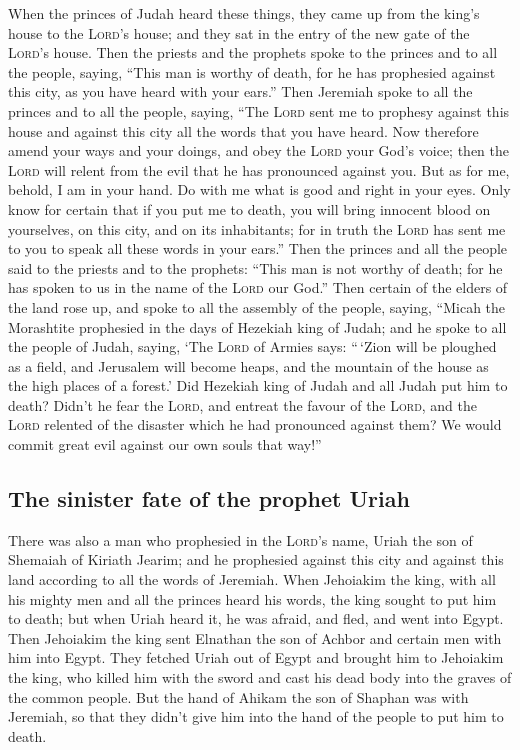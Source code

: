  When the princes of Judah heard these things, they came
up from the king's house to the \textsc{Lord}'s house; and they sat in
the entry of the new gate of the \textsc{Lord}'s house. 
Then the priests and the prophets spoke to the princes and to all the
people, saying, ``This man is worthy of death, for he has prophesied
against this city, as you have heard with your ears.'' 
Then Jeremiah spoke to all the princes and to all the people, saying,
``The \textsc{Lord} sent me to prophesy against this house and against
this city all the words that you have heard.  Now
therefore amend your ways and your doings, and obey the \textsc{Lord}
your God's voice; then the \textsc{Lord} will relent from the evil that
he has pronounced against you.  But as for me, behold, I
am in your hand. Do with me what is good and right in your eyes.
 Only know for certain that if you put me to death, you
will bring innocent blood on yourselves, on this city, and on its
inhabitants; for in truth the \textsc{Lord} has sent me to you to speak
all these words in your ears.''  Then the princes and all
the people said to the priests and to the prophets: ``This man is not
worthy of death; for he has spoken to us in the name of the
\textsc{Lord} our God.''  Then certain of the elders of
the land rose up, and spoke to all the assembly of the people, saying,
 ``Micah the Morashtite prophesied in the days of
Hezekiah king of Judah; and he spoke to all the people of Judah, saying,
`The \textsc{Lord} of Armies says: ``\,`Zion will be ploughed as a
field, and Jerusalem will become heaps, and the mountain of the house as
the high places of a forest.'  Did Hezekiah king of Judah
and all Judah put him to death? Didn't he fear the \textsc{Lord}, and
entreat the favour of the \textsc{Lord}, and the \textsc{Lord} relented
of the disaster which he had pronounced against them? We would commit
great evil against our own souls that way!''

\hypertarget{the-sinister-fate-of-the-prophet-uriah}{%
\subsection{The sinister fate of the prophet
Uriah}\label{the-sinister-fate-of-the-prophet-uriah}}

 There was also a man who prophesied in the
\textsc{Lord}'s name, Uriah the son of Shemaiah of Kiriath Jearim; and
he prophesied against this city and against this land according to all
the words of Jeremiah.  When Jehoiakim the king, with all
his mighty men and all the princes heard his words, the king sought to
put him to death; but when Uriah heard it, he was afraid, and fled, and
went into Egypt.  Then Jehoiakim the king sent Elnathan
the son of Achbor and certain men with him into Egypt. 
They fetched Uriah out of Egypt and brought him to Jehoiakim the king,
who killed him with the sword and cast his dead body into the graves of
the common people.  But the hand of Ahikam the son of
Shaphan was with Jeremiah, so that they didn't give him into the hand of
the people to put him to death.

